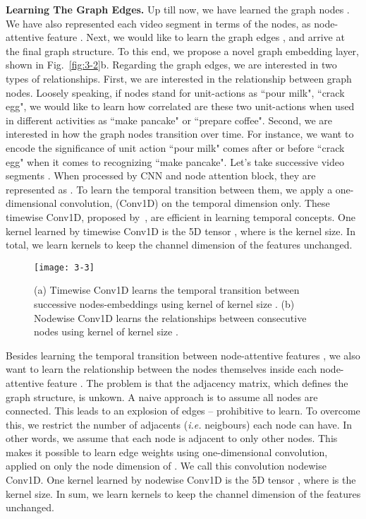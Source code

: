 \documentclass[10pt,twocolumn,letterpaper]{article}
\newcommand{\partitle}[1]{\noindent\textbf{#1}}
\newcommand{\ptspace}{\vspace*{5pt}}
\begin{document}
\ptspace
\partitle{Learning The Graph Edges.}
Up till now, we have learned the graph nodes .
We have also represented each video segment  in terms of the nodes, as node-attentive feature .
Next, we would like to learn the graph edges , and arrive at the final graph structure.
To this end, we propose a novel graph embedding layer, shown in Fig.~\ref{fig:3-2}{\color{red}b}.
Regarding the graph edges, we are interested in two types of relationships.
First, we are interested in the relationship between graph nodes.
Loosely speaking, if nodes stand for unit-actions as ``pour milk", ``crack egg", we would like to learn how correlated are these two unit-actions when used in different activities as ``make pancake" or ``prepare coffee".
Second, we are interested in how the graph nodes transition over time.
For instance, we want to encode the significance of unit action ``pour milk" comes after or before ``crack egg" when it comes to recognizing ``make pancake".
Let's take  successive video segments .
When processed by CNN and node attention block, they are represented as .
To learn the temporal transition between them, we apply a one-dimensional convolution, (Conv1D) on the temporal dimension only.
These timewise Conv1D, proposed by~\cite{hussein2018timeception}, are efficient in learning temporal concepts.
One kernel learned by timewise Conv1D is the 5D tensor , where  is the kernel size.
In total, we learn  kernels to keep the channel dimension of the features  unchanged.

\begin{figure}[!ht]
\begin{center}
\texttt{[image: 3-3]}
\end{center}
\caption{(a) Timewise Conv1D learns the temporal transition between successive nodes-embeddings  using kernel  of kernel size .
(b) Nodewise Conv1D learns the relationships between consecutive nodes  using kernel  of kernel size .}
\label{fig:3-3}
\end{figure}

Besides learning the temporal transition between node-attentive features , we also want to learn the relationship between the nodes themselves  inside each node-attentive feature .
The problem is that the adjacency matrix, which defines the graph structure, is unkown.
A naive approach is to assume all nodes are connected.
This leads to an explosion of  edges -- prohibitive to learn.
To overcome this, we restrict the number of adjacents (\textit{i.e.} neigbours) each node  can have.
In other words, we assume that each node  is adjacent to only  other nodes.
This makes it possible to learn edge weights using one-dimensional convolution, applied on only the node dimension of .
We call this convolution nodewise Conv1D.
One kernel learned by nodewise Conv1D is the 5D tensor , where  is the kernel size.
In sum, we learn  kernels to keep the channel dimension of the features  unchanged.
\end{document}
